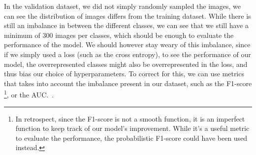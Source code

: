 \documentclass[11pt]{article}
\begin{document}
    In the validation dataset, we did not simply randomly sampled the images, we can
    see the distribution of images differs from the training dataset. While there is still an imbalance in between the different classes, we can see that we
    still have a minimum of 300 images per classes, which should be enough to evaluate the performance of the model.
    We should however stay weary of this imbalance, since if we simply used a loss (such as the cross entropy), to
    see the performance of our model, the overrepresented classes might also be overrepresented in the loss, and thus
    bias our choice of hyperparameters. To correct for this, we can use metrics that takes into account the imbalance
    present in our dataset, such as the F1-score \footnote{In retrospect, since the F1-score is not a smooth function, it is an imperfect function to
    keep track of our model's improvement. While it's a useful metric to evaluate the performance, the probabilistic F1-score \cite{probabilisticf1} could have been used instead.}, or the AUC.~\cite{metrics}.
\end{document}
